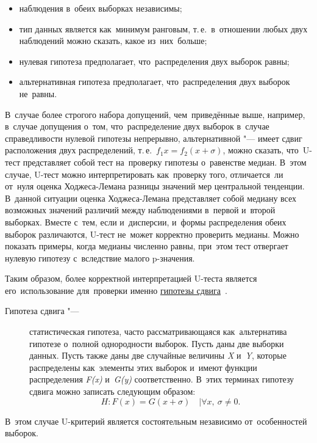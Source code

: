\documentclass[]{scrartcl}
\begin{document}
\begin{itemize}
	\item наблюдения в~обеих выборках независимы;
	\item тип данных является как~минимум ранговым, т.\,е.~в~отношении любых двух наблюдений можно сказать, какое из~них~больше;
	\item нулевая гипотеза предполагает, что~распределения двух выборок равны;
	\item альтернативная гипотеза предполагает, что~распределения двух выборок не~равны.
\end{itemize}
В~случае более строгого набора допущений, чем~приведённые выше, например, в~случае допущения о~том, что~распределение двух выборок в~случае справедливости нулевой гипотезы непрерывно, альтернативной "--- имеет сдвиг расположения двух распределений, т.\,е.~$f_{1}{x}=f_{2}(x+\sigma)$, можно сказать, что~U-тест представляет собой тест на~проверку гипотезы о~равенстве медиан. В~этом случае, U-тест можно интерпретировать как~проверку того, отличается~ли от~нуля оценка Ходжеса-Лемана разницы значений мер центральной тенденции. В~данной ситуации оценка Ходжеса-Лемана представляет собой медиану всех возможных значений различий между наблюдениями в~первой и~второй выборках. Вместе с~тем, если и~дисперсии, и~формы распределения обеих выборок различаются, U-тест не~может корректно проверить медианы. Можно показать примеры, когда медианы численно равны, при~этом тест отвергает нулевую гипотезу с~вследствие малого p-значения.

Таким образом, более корректной интерпретацией U-теста является его~использование для~проверки именно \href{http://www.machinelearning.ru/wiki/index.php?title=Гипотеза_сдвига}{гипотезы сдвига}~\cite{MLRU:shift-hypothesis}.
\begin{description}
	\item[Гипотеза сдвига "---] статистическая гипотеза, часто рассматривающаяся как~альтернатива гипотезе о~полной однородности выборок. Пусть даны две выборки данных. Пусть также даны две случайные величины \textit{X} и~\textit{Y}, которые распределены как~элементы этих выборок и~имеют функции распределения \textit{F(x)} и~\textit{G(y)} соответственно. В~этих терминах гипотезу сдвига можно записать следующим образом: 
	\begin{equation}
		H:F(x)=G(x+\sigma) \quad| \forall x,\ \sigma \neq 0.
	\end{equation}
\end{description}
В~этом случае U-критерий является состоятельным независимо от~особенностей выборок.
\end{document}
